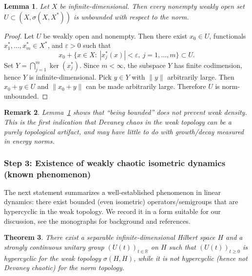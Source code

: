 \documentclass[12pt]{article}
\newtheorem{theorem}{Theorem}[section]
\newtheorem{lemma}[theorem]{Lemma}
\newtheorem{remark}[theorem]{Remark}
\begin{document}
\begin{lemma}
\label{lem:weak_neighborhoods_unbounded}
Let $X$ be infinite-dimensional. Then every nonempty weakly open set $U\subset (X,\sigma(X,X^\ast))$ is unbounded with respect to the norm.
\end{lemma}

\begin{proof}
Let $U$ be weakly open and nonempty. Then there exist $x_0\in U$, functionals $x_1^\ast,\dots,x_m^\ast\in X^\ast$, and $\varepsilon>0$ such that
\[
x_0+\bigl\{x\in X:\ |x_j^\ast(x)|<\varepsilon,\ j=1,\dots,m\bigr\}\subset U.
\]
Set $Y=\bigcap_{j=1}^m \ker(x_j^\ast)$. Since $m<\infty$, the subspace $Y$ has finite codimension, hence $Y$ is infinite-dimensional. Pick $y\in Y$ with $\|y\|$ arbitrarily large. Then $x_0+y\in U$ and $\|x_0+y\|$ can be made arbitrarily large. Therefore $U$ is norm-unbounded.
\end{proof}

\begin{remark}
Lemma~\ref{lem:weak_neighborhoods_unbounded} shows that ``being bounded'' does not prevent weak density. This is the first indication that Devaney chaos in the weak topology can be a purely topological artifact, and may have little to do with growth/decay measured in energy norms.
\end{remark}

\subsubsection*{Step 3: Existence of weakly chaotic isometric dynamics (known phenomenon)}

The next statement summarizes a well-established phenomenon in linear dynamics: there exist bounded (even isometric) operators/semigroups that are hypercyclic in the weak topology. We record it in a form suitable for our discussion, see the monographs
\cite{BayartMatheron2009,GrosseErdmannPeris2011} for background and references.

\begin{theorem}{\cite{BayartMatheron2009,GrosseErdmannPeris2011}}
\label{thm:exist_weak_hypercyclic_isometry}
There exist a separable infinite-dimensional Hilbert space $H$ and a strongly continuous \emph{unitary} group $(U(t))_{t\in\mathbb{R}}$ on $H$ such that $(U(t))_{t\ge 0}$ is hypercyclic for the weak topology $\sigma(H,H)$, while it is not hypercyclic (hence not Devaney chaotic) for the norm topology.
\end{theorem}
\end{document}
